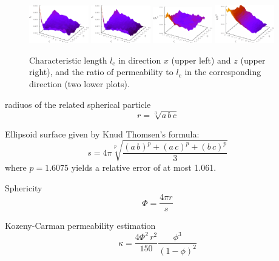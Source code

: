 \documentclass[aps,twocolumn,superscriptaddress,showpacs,showkeys]{revtex4-1}
\newcommand{\lc}{{l_{\mathrm{c}}}}  %
\begin{document}
\begin{figure}[h]
\begin{center}
\includegraphics*[width=0.23\textwidth]{data-figs/lc_x}
\includegraphics*[width=0.23\textwidth]{data-figs/lc_z}
\includegraphics*[width=0.23\textwidth]{data-figs/k_lc_x}
\includegraphics*[width=0.23\textwidth]{data-figs/k_lc_z}
\caption{\protect
	Characteristic length $\lc$ in direction $x$ (upper left) and $z$ (upper right), and 
	the ratio of permeability to $\lc$ in the corresponding direction (two lower plots).
	}
\label{fig:lc}
\end{center}
\end{figure}


radiuos of the related spherical particle
\begin{equation}
  r=\sqrt[3]{a\,b\,c}
\end{equation}

Ellipsoid surface given by Knud Thomsen's formula:
\begin{equation}
 s = 4\pi\sqrt[p]{ \frac{ (a\,b)^{p} + (a\,c)^{p} + (b\,c)^{p} }{3}}
\end{equation}
where $p = 1.6075$ yields a relative error of at most 1.061.

Sphericity
\begin{equation}
  \Phi = \frac{4\pi r}{s}
\end{equation}

Kozeny-Carman permeability estimation
\begin{equation}
\kappa = \frac{4 \Phi^{2}\,r^{2}}{150}\frac{\phi^{3}}{(1-\phi)^{2}}
\end{equation}
\end{document}
